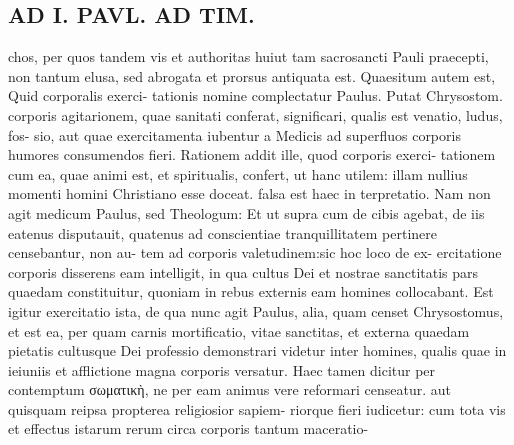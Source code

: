 \documentclass{article}
\begin{document}
\begin{pages}
\section*{AD I. PAVL. AD TIM. }
\marginpar{[ p.208 ]}chos, per quos tandem vis et authoritas huiut tam sacrosancti Pauli praecepti, non tantum elusa, sed abrogata et prorsus antiquata est. Quaesitum autem est, Quid corporalis exerci- tationis nomine complectatur Paulus. Putat Chrysostom. corporis agitarionem, quae sanitati conferat, significari, qualis est venatio, ludus, fos- sio, aut quae exercitamenta iubentur a Medicis ad superfluos corporis humores consumendos fieri. Rationem addit ille, quod corporis exerci- tationem cum ea, quae animi est, et spiritualis, confert, ut hanc utilem: illam nullius momenti homini Christiano esse doceat. falsa est haec in terpretatio. Nam non agit medicum Paulus, sed Theologum: Et ut supra cum de cibis agebat, de iis eatenus disputauit, quatenus ad conscientiae tranquillitatem pertinere censebantur, non au- tem ad corporis valetudinem:sic hoc loco de ex- ercitatione corporis disserens eam intelligit, in qua cultus Dei et nostrae sanctitatis pars quaedam constituitur, quoniam in rebus externis eam homines collocabant. Est igitur exercitatio ista, de qua nunc agit Paulus, alia, quam censet Chrysostomus, et est ea, per quam carnis mortificatio, vitae sanctitas, et externa quaedam pietatis cultusque Dei professio demonstrari videtur inter homines, qualis quae in ieiuniis et afflictione magna corporis versatur. Haec tamen dicitur per contemptum σωματικὴ, ne per eam animus vere reformari censeatur. aut quisquam reipsa propterea religiosior sapiem- riorque fieri iudicetur: cum tota vis et effectus istarum rerum circa corporis tantum maceratio- 

\end{pages}
\end{document}
